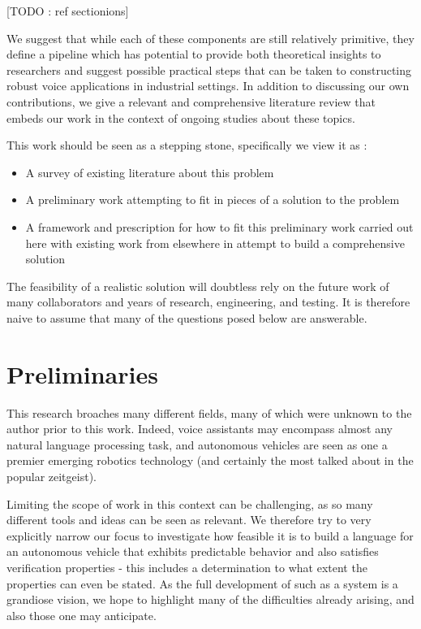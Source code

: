 \documentclass[a4paper, 11pt]{article}
\begin{document}
  [TODO : ref sectionions]

We suggest that while each of these components are still relatively primitive,
they define a pipeline which has potential to provide both theoretical insights
to researchers and suggest possible practical steps that can be taken to
constructing robust voice applications in industrial settings. In addition to
discussing our own contributions, we give a relevant and comprehensive literature
review that embeds our work in the context of ongoing studies about these
topics.

This work should be seen as a stepping stone, specifically we view it as :

\begin{itemize}[noitemsep]
\item A survey of existing literature about this problem 
\item A preliminary work attempting to fit in pieces of a solution to the problem  
\item A framework and prescription for how to fit this preliminary work carried
  out here with existing work from elsewhere in attempt to build a comprehensive solution
\end{itemize}

The feasibility of a realistic solution will doubtless rely on the future work
of many collaborators and years of research, engineering, and testing. It is
therefore naive to assume that many of the questions posed below are answerable.


\section{Preliminaries} 

This research broaches many different fields, many of which were
unknown to the author prior to this work. Indeed, voice assistants may
encompass almost any natural language processing task, and autonomous vehicles are
seen as one a premier emerging robotics technology (and certainly the most talked
about in the popular zeitgeist).

Limiting the scope of work in this context can be challenging, as so many
different tools and ideas can be seen as relevant. We therefore try to very
explicitly narrow our focus to investigate how feasible it is to build a
language for an autonomous vehicle that exhibits predictable behavior and also
satisfies verification properties - this includes a determination to what extent
the properties can even be stated. As the full development of such as a system
is a grandiose vision, we hope to highlight many of the difficulties already
arising, and also those one may anticipate.
\end{document}
